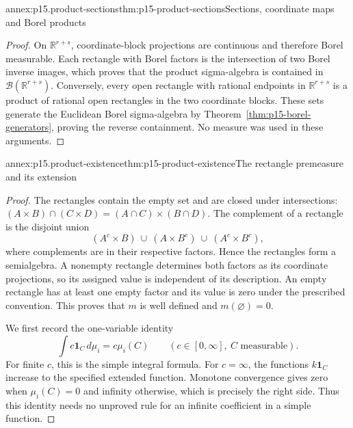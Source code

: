 \begin{annexitem}{annex:p15.product-sections}{thm:p15-product-sections}{Sections, coordinate maps and Borel products}
\begin{proof}
On \(\mathbb R^{r+s}\), coordinate-block projections are continuous
and therefore Borel measurable. Each rectangle with Borel factors is
the intersection of two Borel inverse images, which proves that the
product sigma-algebra is contained in \(\mathcal B(\mathbb R^{r+s})\).
Conversely, every open rectangle with rational endpoints in
\(\mathbb R^{r+s}\) is a product of rational open rectangles in
the two coordinate blocks. These sets generate the Euclidean Borel
sigma-algebra by Theorem~\ref{thm:p15-borel-generators}, proving the
reverse containment. No measure was used in these arguments.
\end{proof}
\end{annexitem}

\begin{annexitem}{annex:p15.product-existence}{thm:p15-product-existence}{The rectangle premeasure and its extension}
\begin{proof}
The rectangles contain the empty set and are closed under intersections:
\((A\times B)\cap(C\times D)=(A\cap C)\times(B\cap D)\).
The complement of a rectangle is the disjoint union
\[
 (A^c\times B)\ \cup\ (A\times B^c)\ \cup\ (A^c\times B^c),
\]
where complements are in their respective factors. Hence the rectangles
form a semialgebra. A nonempty rectangle determines both factors as its
coordinate projections, so its assigned value is independent of its
description. An empty rectangle has at least one empty factor and its
value is zero under the prescribed convention. This proves that \(m\)
is well defined and \(m(\varnothing)=0\).

We first record the one-variable identity
\[
 \int c\mathbf1_C\,d\mu_i=c\mu_i(C)
       \qquad(c\in[0,\infty],\ C\text{ measurable}).
\]
For finite \(c\), this is the simple integral formula. For
\(c=\infty\), the functions \(k\mathbf1_C\) increase to the
specified extended function. Monotone convergence gives zero when
\(\mu_i(C)=0\) and infinity otherwise, which is precisely the
right side. Thus this identity needs no unproved rule for an infinite
coefficient in a simple function.


\end{proof}
\end{annexitem}
